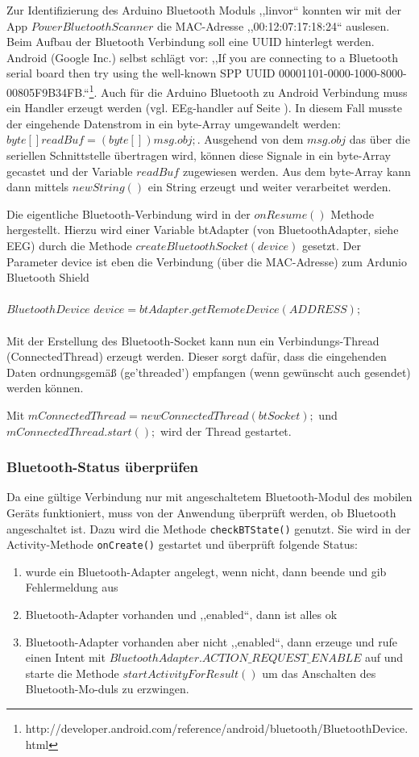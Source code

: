 \documentclass[10pt, a4paper, oneside, titlepage]{scrartcl} %
\begin{document}
	Zur Identifizierung des Arduino Bluetooth Moduls ,,linvor`` konnten wir mit der App $Power Bluetooth Scanner$ die MAC-Adresse ,,00:12:07:17:18:24`` auslesen. 
	Beim Aufbau der Bluetooth Verbindung soll eine UUID hinterlegt werden. Android (Google Inc.) selbst schlägt vor: ,,If you are connecting to a Bluetooth serial board then try using the well-known SPP UUID 00001101-0000-1000-8000-00805F9B34FB.``\footnote{http://developer.android.com/reference/android/bluetooth/BluetoothDevice.html}. 
	Auch für die Arduino Bluetooth zu Android Verbindung muss ein Handler erzeugt werden (vgl. EEg-handler auf Seite \pageref{handler}).
	In diesem Fall musste der eingehende Datenstrom in ein byte-Array umgewandelt werden: $byte[] readBuf = (byte[]) msg.obj;$. Ausgehend von dem $msg.obj$ das über die seriellen Schnittstelle übertragen wird, können diese Signale in ein byte-Array gecastet und der Variable $readBuf$ zugewiesen werden. Aus dem byte-Array kann dann mittels $new String()$ ein String erzeugt und weiter verarbeitet werden.
	
	Die eigentliche Bluetooth-Verbindung wird in der $onResume()$ Methode hergestellt. Hierzu wird einer Variable btAdapter (von BluetoothAdapter, siehe EEG) durch die Methode $create BluetoothSocket(device)$ gesetzt. 
	Der Parameter device ist eben die Verbindung (über die MAC-Adresse) zum Ardunio Bluetooth Shield \\ \\
	$BluetoothDevice$ $device = btAdapter.getRemoteDevice(ADDRESS);$\\ \\
	Mit der Erstellung des Bluetooth-Socket kann nun ein Verbindungs-Thread (ConnectedThread) erzeugt werden. Dieser sorgt dafür, dass die eingehenden Daten ordnungsgemäß (ge'threaded') empfangen (wenn gewünscht auch gesendet) werden können. 
	
	Mit $mConnectedThread = new ConnectedThread(btSocket);$ und \\$mConnectedThread.start();$ wird der Thread gestartet.
	
	\subsubsection*{Bluetooth-Status überprüfen}
	
	Da eine gültige Verbindung nur mit angeschaltetem Bluetooth-Modul des mobilen Geräts funktioniert, muss von der Anwendung überprüft werden, ob Bluetooth angeschaltet ist. Dazu wird die Methode \texttt{checkBTState()} genutzt. Sie wird in der Activity-Methode \texttt{onCreate()} gestartet und überprüft folgende Status:
	\begin{enumerate}
	\item wurde ein Bluetooth-Adapter angelegt, wenn nicht, dann beende und gib Fehlermeldung aus
	\item Bluetooth-Adapter vorhanden und ,,enabled``, dann ist alles ok
	\item Bluetooth-Adapter vorhanden aber nicht ,,enabled``, dann erzeuge und rufe einen Intent mit $BluetoothAdapter.ACTION\_REQUEST\_ENABLE$ auf und starte die Methode $startActivityForResult()$ um das Anschalten des Bluetooth-Mo-duls zu erzwingen.
	\end{enumerate}
	
\end{document}
